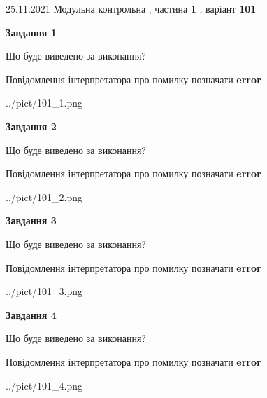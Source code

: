\documentclass[10pt, ukrainian]{article}
\begin{document}
{25.11.2021 Модульна контрольна , частина \textbf { 1 }, варіант  \No \textbf { 101 }\par}
{
\begin {large}

{\begin {center}\textbf{Завдання 1}\end {center}}\par
Що буде виведено за виконання? \par
Повідомлення інтерпретатора про помилку позначати \textbf{error}

\begin{center}
	{../pict/101_1.png}
\end{center}
\newpage

{\begin {center}\textbf{Завдання 2}\end {center}}\par
Що буде виведено за виконання? \par
Повідомлення інтерпретатора про помилку позначати \textbf{error}

\begin{center}
	{../pict/101_2.png}
\end{center}
\newpage

{\begin {center}\textbf{Завдання 3}\end {center}}\par
Що буде виведено за виконання? \par
Повідомлення інтерпретатора про помилку позначати \textbf{error}

\begin{center}
	{../pict/101_3.png}
\end{center}
\newpage

{\begin {center}\textbf{Завдання 4}\end {center}}\par
Що буде виведено за виконання? \par
Повідомлення інтерпретатора про помилку позначати \textbf{error}

\begin{center}
	{../pict/101_4.png}
\end{center}
\newpage


\end{large}}
\end{document}
